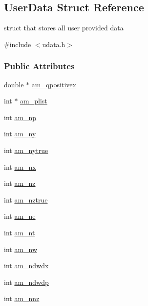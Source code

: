 \hypertarget{struct_user_data}{}\subsection{User\+Data Struct Reference}
\label{struct_user_data}


struct that stores all user provided data  




{\ttfamily \#include $<$udata.\+h$>$}

\subsubsection*{Public Attributes}
\begin{DoxyCompactItemize}
\item 
double $\ast$ \hyperlink{struct_user_data_a24dcfe2da485ad1964d807779fce2092}{am\+\_\+qpositivex}
\item 
int $\ast$ \hyperlink{struct_user_data_a122fcb4f213656e29d30e1e8713fcf1c}{am\+\_\+plist}
\item 
int \hyperlink{struct_user_data_a1b32993ff88dfae4dd2aab311c24cc26}{am\+\_\+np}
\item 
int \hyperlink{struct_user_data_a1c8d4eb301c60c34dc4870faca7ce5a4}{am\+\_\+ny}
\item 
int \hyperlink{struct_user_data_a52aef12adf85a9a7361e79608bcf0e91}{am\+\_\+nytrue}
\item 
int \hyperlink{struct_user_data_a00ba9cf99f8f02b663241bb76b76ce96}{am\+\_\+nx}
\item 
int \hyperlink{struct_user_data_af6f8dfb3615c37e31bc8a1b232d2c99e}{am\+\_\+nz}
\item 
int \hyperlink{struct_user_data_ae8335840fdbd8b91daef2c0affee61dc}{am\+\_\+nztrue}
\item 
int \hyperlink{struct_user_data_a1ee2e63bd2b30c7196b4984014fbc3a4}{am\+\_\+ne}
\item 
int \hyperlink{struct_user_data_a08ea6ecb241cd86a6f171761a48e27dd}{am\+\_\+nt}
\item 
int \hyperlink{struct_user_data_abafd93498a922dbe7a03af57f45fcee9}{am\+\_\+nw}
\item 
int \hyperlink{struct_user_data_a0723cf4e6ad49bf9d0eb18de66fdcd07}{am\+\_\+ndwdx}
\item 
int \hyperlink{struct_user_data_a87a3b720bf2ea277332fa3b35f5875a4}{am\+\_\+ndwdp}
\item 
int \hyperlink{struct_user_data_a43ad1c7f840dc744be4251902a4ae91d}{am\+\_\+nnz}

\end{DoxyCompactItemize}
